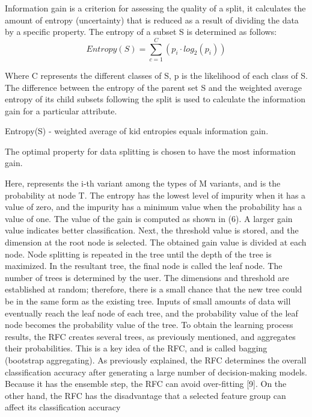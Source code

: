 \documentclass[runningheads]{llncs}
\begin{document}
Information gain is a criterion for assessing the quality of a split, it calculates the amount of entropy (uncertainty) that is reduced as a result of dividing the data by a specific property. The entropy of a subset S is determined as follows:
\begin{equation}
Entropy(S) = \sum_{c=1}^{C} (p_i \cdot log_2(p_i))
\end{equation}

Where C represents the different classes of S, p is the likelihood of each class of S.\\
The difference between the entropy of the parent set S and the weighted average entropy of its child subsets following the split is used to calculate the information gain for a particular attribute.

Entropy(S) - weighted average of kid entropies equals information gain.

The optimal property for data splitting is chosen to have the most information gain.


Here, represents the i-th variant among the types of M variants, and is the
probability at node T. The entropy has the lowest level of impurity when it has a value of zero,
and the impurity has a minimum value when the probability has a value of one. The value of
the gain is computed as shown in (6).
A larger gain value indicates better classification. Next, the threshold value is stored, and
the dimension at the root node is selected. The obtained gain value is divided at each node.
Node splitting is repeated in the tree until the depth of the tree is maximized. In the resultant
tree, the final node is called the leaf node. The number of trees is determined by the user. The
dimensions and threshold are established at random; therefore, there is a small chance that the
new tree could be in the same form as the existing tree. Inputs of small amounts of data will
eventually reach the leaf node of each tree, and the probability value of the leaf node becomes
the probability value of the tree. To obtain the learning process results, the RFC creates several
trees, as previously mentioned, and aggregates their probabilities. This is a key idea of the
RFC, and is called bagging (bootstrap aggregating). As previously explained, the RFC
determines the overall classification accuracy after generating a large number of
decision-making models. Because it has the ensemble step, the RFC can avoid over-fitting [9].
On the other hand, the RFC has the disadvantage that a selected feature group can affect its
classification accuracy
 
\end{document}
